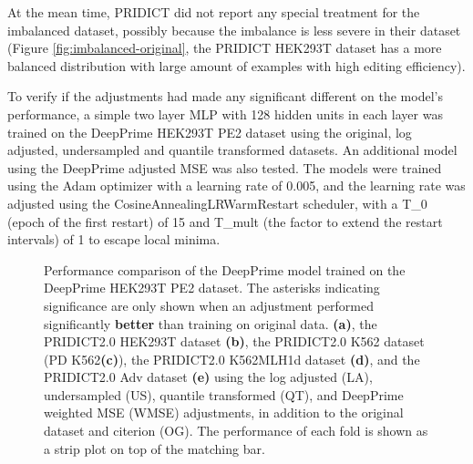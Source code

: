 At the mean time, PRIDICT did not report any special treatment for the imbalanced dataset, possibly because the imbalance is less severe in their dataset (Figure \ref{fig:imbalanced-original}, the PRIDICT HEK293T dataset has a more balanced distribution with large amount of examples with high editing efficiency). 

To verify if the adjustments had made any significant different on the model's performance, a simple two layer MLP with 128 hidden units in each layer was trained on the DeepPrime HEK293T PE2 dataset using the original, log adjusted, undersampled and quantile transformed datasets. An additional model using the DeepPrime adjusted MSE was also tested. The models were trained using the Adam optimizer with a learning rate of 0.005, and the learning rate was adjusted using the CosineAnnealingLRWarmRestart scheduler, with a T\_0 (epoch of the first restart) of 15 and T\_mult (the factor to extend the restart intervals) of 1 to escape local minima. 

\begin{figure}
    \centering
    \vspace{-3mm} %
    \vspace{-3mm}
    \vspace{-3mm}
    \vspace{-3mm}
    \vspace{-3mm}
    \caption[DeepPrime model performance comparison after adjustments]{Performance comparison of the DeepPrime model trained on the DeepPrime HEK293T PE2 dataset. The asterisks indicating significance are only shown when an adjustment performed significantly \textbf{better} than training on original data. \textbf{(a)}, the PRIDICT2.0 HEK293T dataset \textbf{(b)}, the PRIDICT2.0 K562 dataset (PD K562\textbf{(c)}), the PRIDICT2.0 K562MLH1d dataset \textbf{(d)}, and the PRIDICT2.0 Adv dataset \textbf{(e)} using the log adjusted (LA), undersampled (US), quantile transformed (QT), and DeepPrime weighted MSE (WMSE) adjustments, in addition to the original dataset and citerion (OG). 
    The performance of each fold is shown as a strip plot on top of the matching bar.}
    \label{fig:adjustment-performance}
\end{figure}

